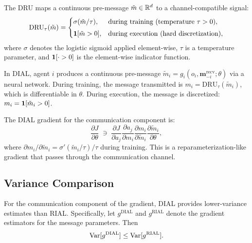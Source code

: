 \documentclass[11pt,a4paper]{article}
\begin{document}
\begin{definition}
\label{def:dru}
The DRU maps a continuous pre-message $\tilde{m} \in \mathbb{R}^d$ to a
channel-compatible signal:
\[
  \mathrm{DRU}_\tau(\tilde{m}) =
  \begin{cases}
    \sigma(\tilde{m} / \tau), & \text{during training
      (temperature } \tau > 0\text{)}, \\[3pt]
    \mathbf{1}[\tilde{m} > 0], & \text{during execution
      (hard discretization)},
  \end{cases}
\]
where $\sigma$ denotes the logistic sigmoid applied
element-wise, $\tau$ is a temperature parameter, and
$\mathbf{1}[\cdot > 0]$ is the element-wise indicator function.
\end{definition}

\begin{definition}[DIAL]
\label{def:dial}
In DIAL, agent $i$ produces a continuous pre-message
$\tilde{m}_i = g_i(o_i, \mathbf{m}_{-i}^{\mathrm{recv}};
\theta)$ via a neural network.  During training, the message
transmitted is $m_i = \mathrm{DRU}_\tau(\tilde{m}_i)$, which
is differentiable in $\theta$.  During execution, the message
is discretized: $m_i = \mathbf{1}[\tilde{m}_i > 0]$.
\end{definition}

The DIAL gradient for the communication component is:
\begin{equation}
  \frac{\partial J}{\partial \theta} \;\ni\;
  \frac{\partial J}{\partial a_j}
  \frac{\partial a_j}{\partial m_i}
  \frac{\partial m_i}{\partial \tilde{m}_i}
  \frac{\partial \tilde{m}_i}{\partial \theta},
  \label{eq:dial-gradient-chain}
\end{equation}
where $\partial m_i / \partial \tilde{m}_i = \sigma'(\tilde{m}_i
/ \tau) / \tau$ during training.  This is a
reparameterization-like gradient that passes through the
communication channel.

\subsection{Variance Comparison}

\begin{proposition}
\label{prop:dial-variance}
For the communication component of the gradient, DIAL provides
lower-variance estimates than RIAL.  Specifically, let
$g^{\mathrm{DIAL}}$ and $g^{\mathrm{RIAL}}$ denote the gradient
estimators for the message parameters.  Then
\[
  \operatorname{Var}[g^{\mathrm{DIAL}}] \leq \operatorname{Var}[g^{\mathrm{RIAL}}].
\]
\end{proposition}
\end{document}
